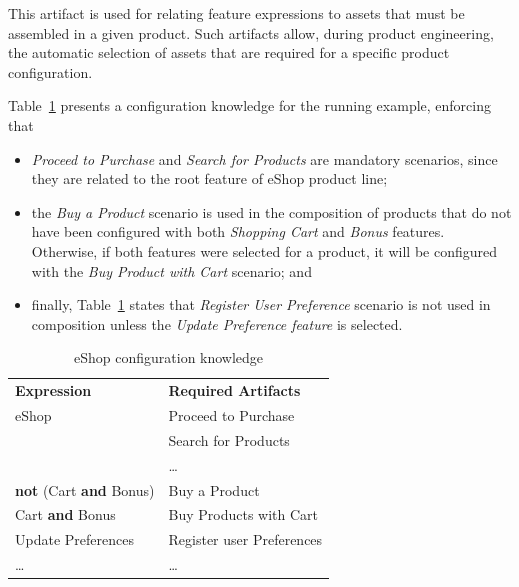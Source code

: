 \documentclass{acm_proc_article-sp}
\begin{document}
This artifact is used for relating feature expressions to assets that must be assembled in a given product. Such artifacts allow, during product engineering, the automatic selection of assets that are required for a specific product configuration. 

Table~\ref{tab:ck-running-example} presents a configuration knowledge 
for the running example, enforcing that

\begin{itemize}
\item \emph{Proceed to Purchase} and 
\emph{Search for Products} are mandatory scenarios, since they are related 
to the root feature of eShop product line;  
\item the \emph{Buy a Product} scenario is used in the composition of products that do not have been configured with both \emph{Shopping Cart} and \emph{Bonus} features. Otherwise, if both features were selected for a product, it will be configured with the \emph{Buy Product with Cart} scenario; and
\item finally, Table~\ref{tab:ck-running-example} states that \emph{Register User Preference} scenario is not used in composition unless the \emph{Update Preference feature} is selected.
\end{itemize}    

\begin{table}[th]
\begin{center}
\caption{eShop configuration knowledge} \label{tab:ck-running-example}
\begin{tabular}{ll}
   \hline\noalign{\smallskip}
  {\bf Expression} & {\bf Required Artifacts} \\
   \noalign{\smallskip}
   \hline
   \noalign{\smallskip}
    eShop & Proceed to Purchase \\
               & Search for Products \\
               & \ldots \\ 
    {\bf not} (Cart {\bf and} Bonus)\hspace{2pt} & Buy a Product \\ 
    Cart {\bf and} Bonus & Buy Products with Cart \\ 
    Update Preferences & Register user Preferences	 \\  
    \ldots & \ldots \\ 
  \hline
\end{tabular}
\end{center}
\end{table}
\end{document}
